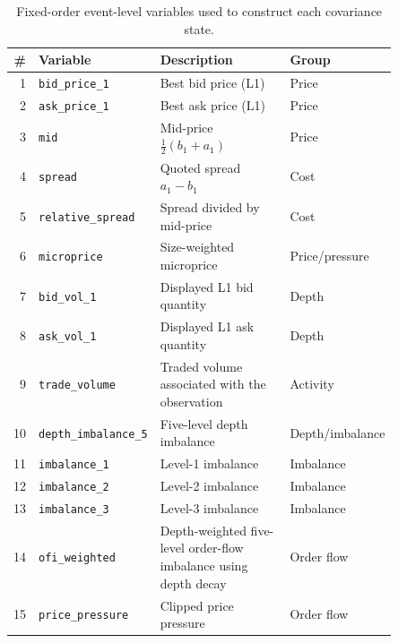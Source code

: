 
\begin{table}[!htbp]
\centering
\caption{Fixed-order event-level variables used to construct each covariance state.}
\label{tab:app_covariance_feature_inventory}
\small
\begin{tabular}{@{}r p{0.22\linewidth} p{0.45\linewidth} p{0.18\linewidth}@{}}
\toprule
\# & Variable & Description & Group\\
\midrule
1  & \texttt{bid\_price\_1}       & Best bid price (L1) & Price\\
2  & \texttt{ask\_price\_1}       & Best ask price (L1) & Price\\
3  & \texttt{mid}                 & Mid-price \(\tfrac{1}{2}(b_1+a_1)\) & Price\\
4  & \texttt{spread}              & Quoted spread \(a_1-b_1\) & Cost\\
5  & \texttt{relative\_spread}    & Spread divided by mid-price & Cost\\
6  & \texttt{microprice}          & Size-weighted microprice & Price/pressure\\
7  & \texttt{bid\_vol\_1}         & Displayed L1 bid quantity & Depth\\
8  & \texttt{ask\_vol\_1}         & Displayed L1 ask quantity & Depth\\
9  & \texttt{trade\_volume}       & Traded volume associated with the observation & Activity\\
10 & \texttt{depth\_imbalance\_5} & Five-level depth imbalance & Depth/imbalance\\
11 & \texttt{imbalance\_1}        & Level-1 imbalance & Imbalance\\
12 & \texttt{imbalance\_2}        & Level-2 imbalance & Imbalance\\
13 & \texttt{imbalance\_3}        & Level-3 imbalance & Imbalance\\
14 & \texttt{ofi\_weighted}       & Depth-weighted five-level order-flow imbalance
                                      using depth decay & Order flow\\
15 & \texttt{price\_pressure}     & Clipped price pressure & Order flow\\
\bottomrule
\end{tabular}
\end{table}
